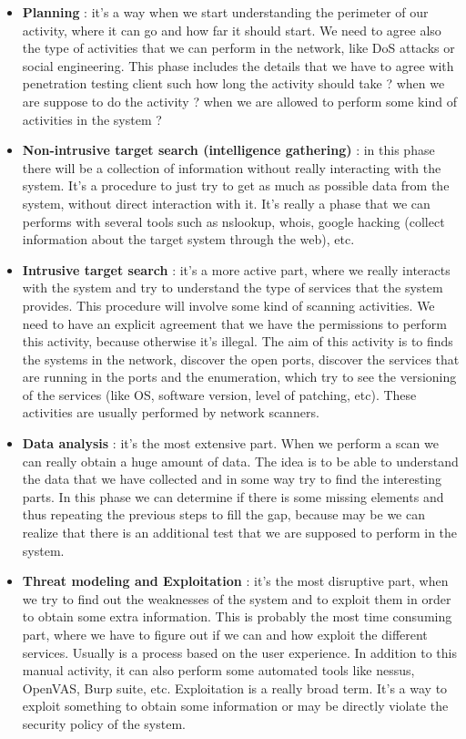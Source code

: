 \documentclass[11pt]{article}
\begin{document}
\begin{itemize}
\item \textbf{Planning} : it's a way when we start understanding the perimeter of our activity, where it can go and how far it should start. We need to agree also the type of activities that we can perform in the network, like DoS attacks or social engineering. This phase includes the details that we have to agree with penetration testing client such how long the activity should take ? when we are suppose to do the activity ? when we are allowed to perform some kind of activities in the system ? 
\item \textbf{Non-intrusive target search (intelligence gathering)} : in this phase there will be a collection of information without really interacting with the system. It's a procedure to just try to get as much as possible data from the system, without direct interaction with it. It's really a phase that we can performs with several tools such as nslookup, whois, google hacking (collect information about the target system through the web), etc.
\item \textbf{Intrusive target search} : it's a more active part, where we really interacts with the system and try to understand the type of services that the system provides. This procedure will involve some kind of scanning activities. We need to have an explicit agreement that we have the permissions to perform this activity, because otherwise it's illegal. The aim of this activity is to finds the systems in the network, discover the open ports, discover the services that are running in the ports and the enumeration, which try to see the versioning of the services (like OS, software version, level of patching, etc). These activities are usually performed by network scanners.
\item \textbf{Data analysis} : it's the most extensive part. When we perform a scan we can really obtain a huge amount of data. The idea is to be able to understand the data that we have collected and in some way try to find the interesting parts. In this phase we can determine if there is some missing elements and thus repeating the previous steps to fill the gap, because may be we can realize that there is an additional test that we are supposed to perform in the system.
\item \textbf{Threat modeling and Exploitation} : it's the most disruptive part, when we try to find out the weaknesses of the system and to exploit them in order to obtain some extra information. This is probably the most time consuming part, where we have to figure out if we can and how exploit the different services. Usually is a process based on the user experience. In addition to this manual activity, it can also perform some automated tools like nessus, OpenVAS, Burp suite, etc. Exploitation is a really broad term. It's a way to exploit something to obtain some information or may be directly violate the security policy of the system.

\end{itemize}
\end{document}
